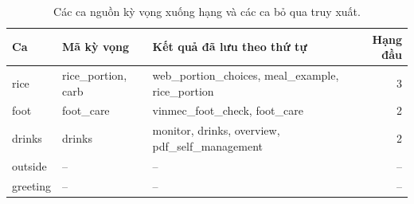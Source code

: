 \par\FloatBarrier\begin{table}[H]\centering\small{}\setlength{\tabcolsep}{5pt}
\caption{Các ca nguồn kỳ vọng xuống hạng và các ca bỏ qua truy xuất.}\begin{tabular}{lP{4cm}P{6cm}r}\toprule
Ca & Mã kỳ vọng & Kết quả đã lưu theo thứ tự & Hạng đầu\\\midrule
rice & rice\_portion, carb & web\_portion\_choices, meal\_example, rice\_portion & 3\\
foot & foot\_care & vinmec\_foot\_check, foot\_care & 2\\
drinks & drinks & monitor, drinks, overview, pdf\_self\_management & 2\\
outside & -- & -- & --\\
greeting & -- & -- & --\\\bottomrule\end{tabular}\end{table}
